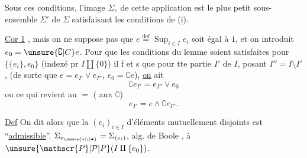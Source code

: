 
Sous ces conditions,  l'image $\Sigma_e$ de cette application est le plus petit sous-ensemble $\Sigma'$ de $\Sigma$ satisfaisant les conditions de (i).

\uline{Cor 1}  , mais on ne suppose pas que $e\overset{\mathrm{def}}{=}\operatorname{Sup}_{i\in I}e_i$ soit égal à $1$, et on introduit $e_0=\unsure{\complement|C}e$. Pour que les conditions du lemme soient satisfaites pour $\{\{e_i\},e_0\}$ (indexé pr $I\amalg\{0\}$) il f et s que  pour tte partie $I'$ de $I$, posant $I''=I\setminus I'$, (de sorte que $e=e_{I'}\vee e_{I''}$,  $e_0=\complement e$),  \uline{on} ait
\[
\complement e_{I'}=e_{I''}\vee e_0
\]
ou ce qui revient au $=$ ( aux $\complement$)
\[
e_{I'}=e\wedge\complement e_{I''}.
\]

\uline{Def} On dit alors que la  $(e_i)_{i\in I}$ d'éléments mutuellement disjoints est ``\uline{admissible}''. $\Sigma_{e_{\unsure{\ast|i|\bullet}}}=\Sigma_{(e_i)}$, alg. de Boole ,  à $\unsure{\mathscr{P}|\mathcal{P}|P}(I\amalg\{e_0\})$.
